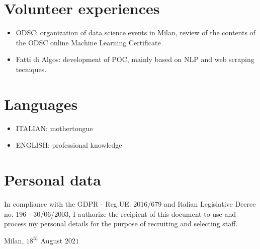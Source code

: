 \documentclass[11pt,a4paper,sans]{moderncv}        %
\begin{document}
\section{Volunteer experiences}
\begin{itemize}
 \item ODSC: organization of data science events in Milan, review of the contents of the ODSC online Machine Learning Certificate
 \item Fatti di Algos: development of POC, mainly based on NLP and web scraping tecniques. 
\end{itemize} 

\section{Languages}
\begin{itemize}
\item ITALIAN: mothertongue
\item ENGLISH: professional knowledge
\end{itemize} 

\section{Personal data}
In compliance with the GDPR - Reg.UE. 2016/679 and Italian Legislative Decree no. 196 - 30/06/2003, I authorize the recipient of this document to use and process my personal details for the purpose of recruiting and selecting staff. 

\bigskip
\bigskip
\bigskip
\bigskip
\bigskip
\bigskip
\bigskip
\bigskip
\bigskip
\bigskip
\bigskip
\bigskip
\bigskip
\bigskip
\bigskip
\bigskip
\bigskip
\bigskip
\bigskip
\bigskip
\bigskip
\bigskip
\bigskip
\bigskip
Milan, $18^{th}$ August $2021$
\end{document}
